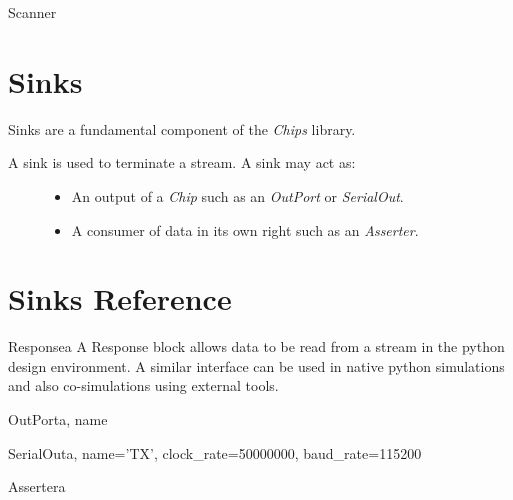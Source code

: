 \documentclass[letterpaper,10pt,english]{manual}
\begin{document}
\hypertarget{chips.Scanner}{}\begin{classdesc}{Scanner}{}\end{classdesc}


\section{Sinks}
\hypertarget{module-chips.sinks}{}
\modulesynopsis{}
Sinks are a fundamental component of the \emph{Chips} library.
\begin{description}
\item[{A sink is used to terminate a stream. A sink may act as:}] \leavevmode\begin{itemize}
\item {} 
An output of a \emph{Chip} such as an \emph{OutPort} or \emph{SerialOut}.

\item {} 
A consumer of data in its own right such as an \emph{Asserter}.

\end{itemize}

\end{description}


\section{Sinks Reference}

\hypertarget{chips.Response}{}\begin{classdesc}{Response}{a}
A Response block allows data to be read from a stream in the python 
design environment. A similar interface can be used in native python
simulations and also co-simulations using external tools.
\end{classdesc}

\hypertarget{chips.OutPort}{}\begin{classdesc}{OutPort}{a, name}\end{classdesc}

\hypertarget{chips.SerialOut}{}\begin{classdesc}{SerialOut}{a, name='TX', clock\_rate=50000000, baud\_rate=115200}\end{classdesc}

\hypertarget{chips.Asserter}{}\begin{classdesc}{Asserter}{a}\end{classdesc}
\end{document}
